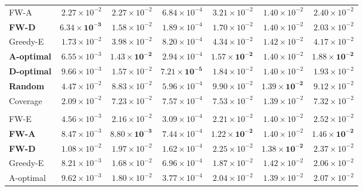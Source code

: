 \documentclass[letterpaper, 9
 pt, conference]{ieeeconf}
\begin{document}
\begin{table}[ht]
\begin{tabular}{lrrrrrr}
FW-A & $2.27\!\times\!10^{-2}$ & $2.27\!\times\!10^{-2}$ & $6.84\!\times\!10^{-4}$ & $3.21\!\times\!10^{-2}$ & $1.40\!\times\!10^{-2}$ & $2.40\!\times\!10^{-2}$ \\
\textbf{FW-D} & $\mathbf{6.34\!\times\!10^{-3}}$ & $1.58\!\times\!10^{-2}$ & $1.89\!\times\!10^{-4}$ & $1.70\!\times\!10^{-2}$ & $1.40\!\times\!10^{-2}$ & $2.03\!\times\!10^{-2}$ \\
Greedy-E & $1.73\!\times\!10^{-2}$ & $3.98\!\times\!10^{-2}$ & $8.20\!\times\!10^{-4}$ & $4.34\!\times\!10^{-2}$ & $1.42\!\times\!10^{-2}$ & $4.17\!\times\!10^{-2}$ \\
\textbf{A-optimal} & $6.55\!\times\!10^{-3}$ & $\mathbf{1.43\!\times\!10^{-2}}$ & $2.94\!\times\!10^{-4}$ & $\mathbf{1.57\!\times\!10^{-2}}$ & $1.40\!\times\!10^{-2}$ & $\mathbf{1.88\!\times\!10^{-2}}$ \\
\textbf{D-optimal} & $9.66\!\times\!10^{-3}$ & $1.57\!\times\!10^{-2}$ & $\mathbf{7.21\!\times\!10^{-5}}$ & $1.84\!\times\!10^{-2}$ & $1.40\!\times\!10^{-2}$ & $1.93\!\times\!10^{-2}$ \\
\textbf{Random} & $4.47\!\times\!10^{-2}$ & $8.83\!\times\!10^{-2}$ & $5.96\!\times\!10^{-4}$ & $9.90\!\times\!10^{-2}$ & $\mathbf{1.39\!\times\!10^{-2}}$ & $9.12\!\times\!10^{-2}$ \\
Coverage & $2.09\!\times\!10^{-2}$ & $7.23\!\times\!10^{-2}$ & $7.57\!\times\!10^{-4}$ & $7.53\!\times\!10^{-2}$ & $1.39\!\times\!10^{-2}$ & $7.32\!\times\!10^{-2}$ \\
\addlinespace[1pt]
\multicolumn{7}{l}{\textit{$K{=}15$}} \\[1pt]
FW-E & $4.56\!\times\!10^{-3}$ & $2.16\!\times\!10^{-2}$ & $3.09\!\times\!10^{-4}$ & $2.21\!\times\!10^{-2}$ & $1.40\!\times\!10^{-2}$ & $2.52\!\times\!10^{-2}$ \\
\textbf{FW-A} & $8.47\!\times\!10^{-3}$ & $\mathbf{8.80\!\times\!10^{-3}}$ & $7.44\!\times\!10^{-4}$ & $\mathbf{1.22\!\times\!10^{-2}}$ & $1.40\!\times\!10^{-2}$ & $\mathbf{1.46\!\times\!10^{-2}}$ \\
\textbf{FW-D} & $1.08\!\times\!10^{-2}$ & $1.97\!\times\!10^{-2}$ & $1.62\!\times\!10^{-4}$ & $2.25\!\times\!10^{-2}$ & $\mathbf{1.38\!\times\!10^{-2}}$ & $2.37\!\times\!10^{-2}$ \\
Greedy-E & $8.21\!\times\!10^{-3}$ & $1.68\!\times\!10^{-2}$ & $6.96\!\times\!10^{-4}$ & $1.87\!\times\!10^{-2}$ & $1.42\!\times\!10^{-2}$ & $2.06\!\times\!10^{-2}$ \\
A-optimal & $9.62\!\times\!10^{-3}$ & $1.80\!\times\!10^{-2}$ & $3.77\!\times\!10^{-4}$ & $2.04\!\times\!10^{-2}$ & $1.39\!\times\!10^{-2}$ & $2.07\!\times\!10^{-2}$ \\

\end{tabular}
\end{table}
\end{document}
